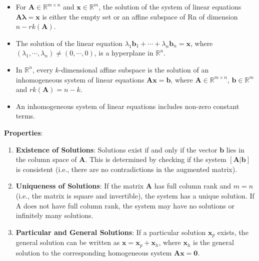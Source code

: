 \begin{itemize}
    \item For $\mathbf{A} \in \mathbb{R}^{m\times n}$ and $\mathbf{x} \in \mathbb{R}^m$, the solution of the system of linear equations $\mathbf{A\boldsymbol{\lambda} = x}$ is either the empty set or an affine subspace of Rn of dimension $n - rk(\mathbf{A})$.

    \item The solution of the linear equation $\lambda_1\mathbf{b}_1 + \cdots + \lambda_n\mathbf{b}_n = \mathbf{x}$, where $(\lambda_1, \cdots , \lambda_n) \neq (0, \cdots , 0)$, is a hyperplane in $\mathbb{R}^n$.

    \item In $\mathbb{R}^n$, every $k$-dimensional affine subspace is the solution of an inhomogeneous system of linear equations $\mathbf{Ax = b}$, where $\mathbf{A} \in \mathbb{R}^{m\times n}$, $\mathbf{b} \in \mathbb{R}^m$ and $rk(\mathbf{A}) = n - k$.

    \item An inhomogeneous system of linear equations includes non-zero constant terms.
\end{itemize}

\vspace{0.2cm}
\textbf{Properties}:
\begin{enumerate}
    \item \textbf{Existence of Solutions}: Solutions exist if and only if the vector $\mathbf{b}$ lies in the column space of $\mathbf{A}$. This is determined by checking if the system $\mathbf{[A|b]}$ is consistent (i.e., there are no contradictions in the augmented matrix).

    \item \textbf{Uniqueness of Solutions}: If the matrix $\mathbf{A}$ has full column rank and $m=n$ (i.e., the matrix is square and invertible), the system has a unique solution. If A does not have full column rank, the system may have no solutions or infinitely many solutions.

    \item \textbf{Particular and General Solutions}: If a particular solution $\mathbf{x}_p$ exists, the general solution can be written as $\mathbf{x}=\mathbf{x}_p +\mathbf{x}_h$, where $\mathbf{x}_h$ is the general solution to the corresponding homogeneous system $\mathbf{Ax=0}$.
\end{enumerate}




